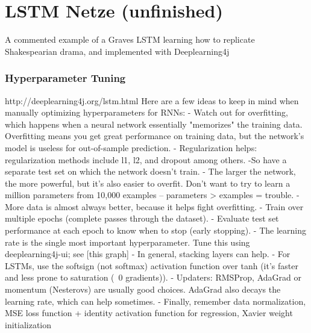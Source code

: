 {%
\section{LSTM Netze (unfinished)}
A commented example of a Graves LSTM learning how to replicate Shakespearian drama, and implemented with Deeplearning4j
\subsubsection{Hyperparameter Tuning}
http://deeplearning4j.org/lstm.html
Here are a few ideas to keep in mind when manually optimizing hyperparameters for RNNs:
   - Watch out for overfitting, which happens when a neural network essentially "memorizes" the training data. Overfitting means you get great performance on training data, but the network’s model is useless for out-of-sample prediction.
   - Regularization helps: regularization methods include l1, l2, and dropout among others.
    -So have a separate test set on which the network doesn’t train.
   - The larger the network, the more powerful, but it’s also easier to overfit. Don’t want to try to learn a million parameters from 10,000 examples – parameters > examples = trouble.
  -  More data is almost always better, because it helps fight overfitting.
  -  Train over multiple epochs (complete passes through the dataset).
   - Evaluate test set performance at each epoch to know when to stop (early stopping).
  -  The learning rate is the single most important hyperparameter. Tune this using deeplearning4j-ui; see [this graph] %
  -  In general, stacking layers can help.
  -  For LSTMs, use the softsign (not softmax) activation function over tanh (it’s faster and less prone to saturation (~0 gradients)).
  -  Updaters: RMSProp, AdaGrad or momentum (Nesterovs) are usually good choices. AdaGrad also decays the learning rate, which can help sometimes.
   - Finally, remember data normalization, MSE loss function + identity activation function for regression, Xavier weight initialization


} %